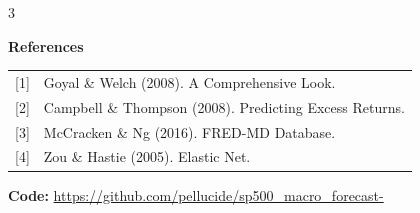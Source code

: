 \documentclass[12pt]{article}
\newcommand{\postersection}[1]{%
  \vspace{0.5em}
  \noindent
  \hspace*{-\leftskip}%
  \colorbox{rhgreen}{\parbox{\dimexpr\linewidth-\rightskip-2\fboxsep\relax}{\textcolor{rhbg}{\textbf{\LARGE #1}}}}\par
  \vspace{0.3em}
}
\begin{document}
\begin{multicols}{3}
\postersection{References}

\large
\begin{tabular}{ll}
{[1]} & Goyal \& Welch (2008). A Comprehensive Look. \\
{[2]} & Campbell \& Thompson (2008). Predicting Excess Returns. \\
{[3]} & McCracken \& Ng (2016). FRED-MD Database. \\
{[4]} & Zou \& Hastie (2005). Elastic Net. \\
\end{tabular}

\vspace{0.8em}
\begin{center}
\colorbox{rhcard}{\parbox{0.8\columnwidth}{\centering\large
\textbf{Code:} \url{https://github.com/pellucide/sp500\_macro\_forecast-}}}
\end{center}

\end{multicols}
\end{document}
